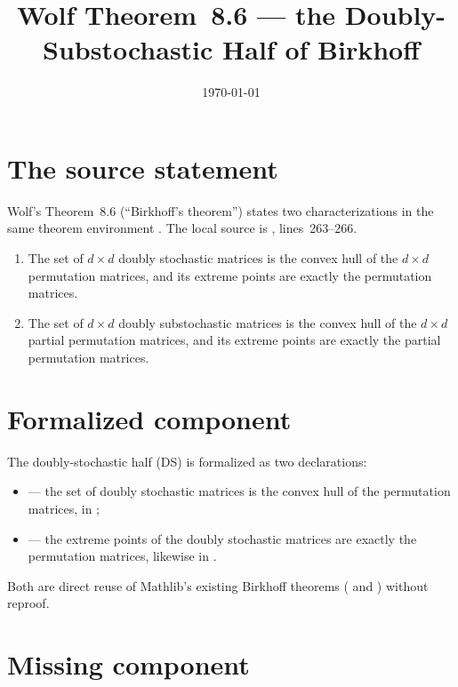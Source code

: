 \documentclass{article}
\title{Wolf Theorem~8.6 --- the Doubly-Substochastic Half of Birkhoff}
\author{}
\date{\today}
\begin{document}
\maketitle
{}

\section{The source statement}

Wolf's Theorem~8.6 (``Birkhoff's theorem'') states two characterizations
in the same theorem environment
\cite[Chapter~8, Theorem~8.6]{Wolf2012Quantum}.  The local source is
, lines~263--266.

\begin{enumerate}
  \item[\textbf{DS}] The set of $d\times d$ doubly stochastic matrices is the
    convex hull of the $d\times d$ permutation matrices, and its extreme
    points are exactly the permutation matrices.
  \item[\textbf{Sub}] The set of $d\times d$ doubly substochastic matrices is
    the convex hull of the $d\times d$ partial permutation matrices, and its
    extreme points are exactly the partial permutation matrices.
\end{enumerate}

\section{Formalized component}

The doubly-stochastic half (DS) is formalized as two declarations:
\begin{itemize}
  \item {}
    --- the set of doubly stochastic matrices is the convex hull of the
    permutation matrices, in ;
  \item {}
    --- the extreme points of the doubly stochastic matrices are exactly the
    permutation matrices, likewise in .
\end{itemize}
Both are direct reuse of Mathlib's existing Birkhoff theorems
( and
) without reproof.

\section{Missing component}
\end{document}
